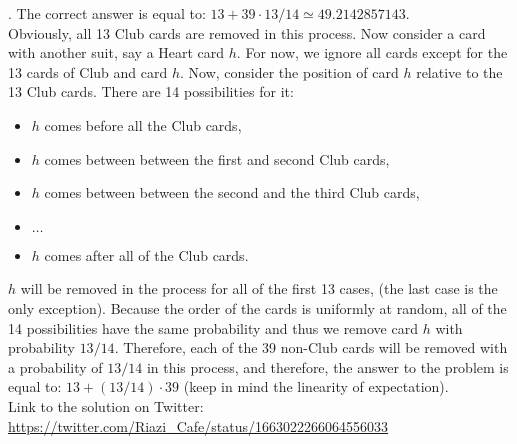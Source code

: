 \begin{solution}.
The correct answer is equal to: $13 + 39 \cdot 13/14 \simeq 49.2142857143$.\\[0.3cm]

\noindent Obviously, all 13 Club cards are removed in this process. Now consider a card with another suit, say a Heart card $h$. For now, we ignore all cards except for the 13 cards of Club and card $h$. Now, consider the position of card $h$ relative to the 13 Club cards. There are 14 possibilities for it:

\begin{itemize}
\item $h$ comes before all the Club cards,
\item $h$ comes between  between the first and second Club cards,
\item $h$ comes between  between the second and the third Club cards,
\item $\ldots$
\item $h$ comes after all of the Club cards.
\end{itemize}

$h$ will be removed in the process for all of the first 13 cases, (the last case is the only exception). Because the order of the cards is uniformly at random, all of the 14 possibilities have the same probability and thus  we remove card $h$ with probability $13/14$. Therefore, each of the 39 non-Club cards will be removed with a probability of $13/14$ in this process, and therefore, the answer to the problem is equal to:
$13 + (13/14) \cdot 39$ (keep in mind the linearity of expectation).\\[0.2cm]

Link to the solution on Twitter:  \url{https://twitter.com/Riazi_Cafe/status/1663022266064556033}\end{solution}